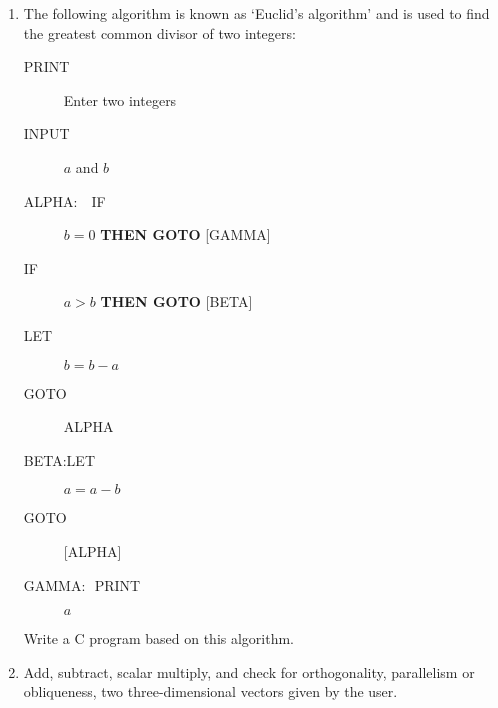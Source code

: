 \documentclass{article}
\begin{document}
\begin{enumerate}
\item The following algorithm is known as `Euclid's algorithm' and is used to find the greatest common divisor of two integers:
\begin{description}
\item[\qquad\qquad \footnotesize\sffamily{} PRINT] Enter two integers \\[-1.75em]
\item[\qquad\qquad \footnotesize\sffamily{} INPUT] $a$ and $b$ \\[-1.75em]
\item[\footnotesize {\normalfont\sffamily{} ALPHA:} \;\,\, \sffamily{} IF] $b = 0$ \textbf{\footnotesize\sffamily{} THEN GOTO} {\footnotesize\sffamily{} [GAMMA]}\\[-1.75em]
\item[\qquad\qquad \footnotesize IF] $a > b$ \textbf{\footnotesize\sffamily{} THEN GOTO} {\footnotesize\sffamily{} [BETA]} \\[-1.75em]
\item[\qquad\qquad \footnotesize\sffamily{} LET] $b = b - a$ \\[-1.75em]
\item[\qquad\qquad \footnotesize\sffamily{} GOTO] {\footnotesize\sffamily{} ALPHA} \\[-1.75em]
\item[\footnotesize {\normalfont\sffamily{} BETA:}\qquad LET] $a = a - b$ \\[-1.75em]
\item[\qquad\qquad \footnotesize\sffamily{} GOTO] {\footnotesize\sffamily{} [ALPHA]} \\[-1.75em]
\item[\footnotesize {\normalfont\sffamily{} GAMMA:}\,\,{\sffamily{} PRINT}] $a$ 
\end{description}

Write a C program based on this algorithm.

\item Add, subtract, scalar multiply, and check for orthogonality, parallelism or obliqueness, two three-dimensional vectors given by the user.
\end{enumerate}
\vspace{5ex}
\end{document}
